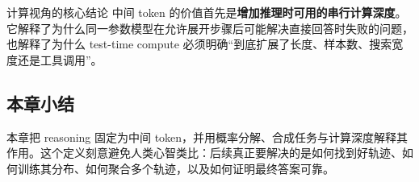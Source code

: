 \begin{importantbox}{计算视角的核心结论}
中间 token 的价值首先是\textbf{增加推理时可用的串行计算深度}。它解释了为什么同一参数模型在允许展开步骤后可能解决直接回答时失败的问题，也解释了为什么 test-time compute 必须明确“到底扩展了长度、样本数、搜索宽度还是工具调用”。
\end{importantbox}

\subsection{本章小结}

本章把 reasoning 固定为中间 token，并用概率分解、合成任务与计算深度解释其作用。这个定义刻意避免人类心智类比：后续真正要解决的是如何找到好轨迹、如何训练其分布、如何聚合多个轨迹，以及如何证明最终答案可靠。

